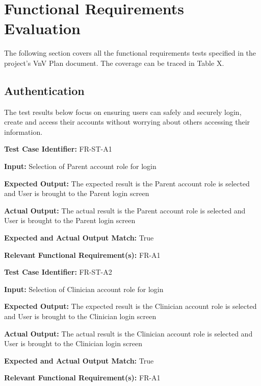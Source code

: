 \documentclass[12pt, titlepage]{article}
\begin{document}
\section{Functional Requirements Evaluation}
\hspace{2em}The following section covers all the functional requirements tests specified in the project's
VnV Plan document. The coverage can be traced in Table X.

\subsection{Authentication}
\hspace{2em}The test results below focus on ensuring users can safely and securely login, create and
access their accounts without worrying about others accessing their information.

\begin{mdframed}[linewidth=0.5mm] \par
  \textbf{Test Case Identifier:} FR-ST-A1 \par
  \textbf{Input:} Selection of Parent account role for login \par
  \textbf{Expected Output:} The expected result is the Parent account role is selected and User is brought to the Parent login screen \par
  \textbf{Actual Output:} The actual result is the Parent account role is selected and User is brought to the Parent login screen \par
  \textbf{Expected and Actual Output Match:} True \par
  \textbf{Relevant Functional Requirement(s):} FR-A1
\end{mdframed}

\begin{mdframed}[linewidth=0.5mm] \par
  \textbf{Test Case Identifier:} FR-ST-A2 \par
  \textbf{Input:} Selection of Clinician account role for login \par
  \textbf{Expected Output:} The expected result is the Clinician account role is selected and User is brought to the Clinician login screen \par
  \textbf{Actual Output:} The actual result is the Clinician account role is selected and User is brought to the Clinician login screen \par
  \textbf{Expected and Actual Output Match:} True \par
  \textbf{Relevant Functional Requirement(s):} FR-A1
\end{mdframed}
\end{document}
